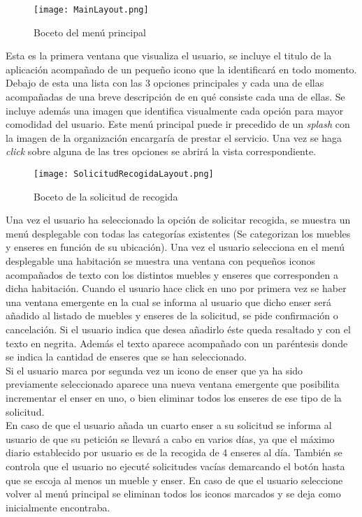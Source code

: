  \begin{figure}[H]
\centering
	\texttt{[image: MainLayout.png]} 
\caption{Boceto del menú principal}
\end{figure}
Esta es la primera ventana que visualiza el usuario, se incluye el titulo de la aplicación acompañado de un pequeño icono que la identificará en todo momento. Debajo de esta una lista con las 3 opciones principales y cada una de ellas acompañadas de una breve descripción de en qué consiste cada una de ellas. Se incluye además una imagen que identifica visualmente cada opción para mayor comodidad del usuario. Este menú principal puede ir precedido de un \textit{splash} con la imagen de la organización encargaría de prestar el servicio. Una vez se haga \textit{click} sobre alguna de las tres opciones se abrirá la vista correspondiente. 
 \begin{figure}[H]
\centering
	\texttt{[image: SolicitudRecogidaLayout.png]} 
\caption{Boceto de la solicitud de recogida}
\end{figure}
Una vez el usuario ha seleccionado la opción de solicitar recogida, se muestra un menú desplegable con todas las categorías existentes (Se categorizan los muebles y enseres en función de su ubicación). Una vez el usuario selecciona en el menú desplegable una habitación se muestra una ventana con pequeños iconos acompañados de texto con los distintos muebles y enseres que corresponden a dicha habitación. Cuando el usuario hace click en uno por primera vez se haber una ventana emergente en la cual se informa al usuario que dicho enser será añadido al listado de muebles y enseres de la solicitud, se pide confirmación o cancelación. Si el usuario indica que desea añadirlo éste queda resaltado y con el texto en negrita. Además el texto aparece acompañado con un paréntesis donde se indica la cantidad de enseres que se han seleccionado. \\
Si el usuario marca por segunda vez un icono de enser que ya ha sido previamente seleccionado aparece una nueva ventana emergente que posibilita incrementar el enser en uno, o bien eliminar todos los enseres de ese tipo de la solicitud. \\
En caso de que el usuario añada un cuarto enser a su solicitud se informa al usuario de que su petición se llevará a cabo en varios días, ya que el máximo diario establecido por usuario es de la recogida de 4 enseres al día. También se controla que el usuario no ejecuté solicitudes vacías demarcando el botón hasta que se escoja al menos un mueble y enser. En caso de que el usuario seleccione volver al menú principal se eliminan todos los iconos marcados y se deja como inicialmente encontraba. 

